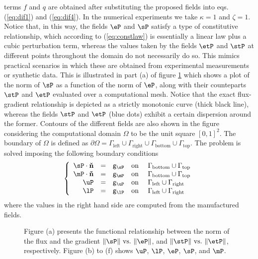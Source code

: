 terms $f$ and $q$ are obtained after substituting the proposed fields 
into eqs. (\ref{eq:dif1}) and (\ref{eq:dif4}). 
In the numerical experiments we take $\kappa = 1$ and $\zeta = 1$.
Notice that, in this way, the fields $\eP$ and $\sP$ satisfy a type of 
constitutive relationship, which according to (\ref{eq:constlaw}) is essentially
a linear law plus a cubic perturbation term, whereas the values taken by the fields 
$\etP$ and $\stP$ at different points throughout the domain do not necessarily do so. 
This mimics practical scenarios in which these are obtained from experimental 
measurements or synthetic data. This is illustrated in part (a) of figure \ref{fig:all_fields_ref} which shows
a plot of the norm of $\sP$ as a function of the norm of $\eP$, along with their counteparts $\stP$ and $\etP$ evaluated over a computational mesh. 
Notice that the exact flux-gradient relationship is depicted as a strictly monotonic curve (thick black line), whereas the fields $\stP$ and $\etP$ (blue dots) exhibit a certain dispersion around the former. Contours of the different fields are also shown in the
figure considering the computational domain $\Omega$ to be the unit square $[0,1]^2$. The boundary of $\Omega$ is defined as $\partial \Omega = \Gamma_{\text{left}} \cup \Gamma_{\text{right}} \cup \Gamma_{\text{bottom}} \cup \Gamma_{\text{top}}$.
The problem is solved imposing the following boundary conditions
\begin{equation}
	\left\lbrace
	\begin{array}{rclll}
		\sP \cdot \mathbf{\check{n}} 			&=& \mathsf{g}_{\sP} 			&\mbox{on}&~\Gamma_{\text{bottom}} \cup \Gamma_{\text{top}} \\
		\mP \cdot \mathbf{\check{n}} &=& \mathsf{g}_{\mP} &\mbox{on}&~\Gamma_{\text{bottom}} \cup \Gamma_{\text{top}} \\
		\uP &=& \mathsf{g}_{\uP} &\mbox{on}&~\Gamma_{\text{left}} \cup \Gamma_{\text{right}} \\
		\lP &=& \mathsf{g}_{\lP} &\mbox{on}&~\Gamma_{\text{left}} \cup \Gamma_{\text{right}} \\
	\end{array}
	\right.
\end{equation}
where the values in the right hand side are computed from the manufactured fields.
\begin{figure}[h!]
	\centering
	\caption{Figure (a) presents the functional relationship between the norm of the flux and the gradient $\|\sP\|~\mbox{vs.}~\|\eP\|$, and $\|\stP\|~\mbox{vs.}~\|\etP\|$, respectively. Figure (b) to (f) shows
		$\uP$, $\lP$, $\eP$, $\sP$, and $\mP$.}
	\def\svgwidth{1.0\columnwidth}
	
	\label{fig:all_fields_ref}
\end{figure}

